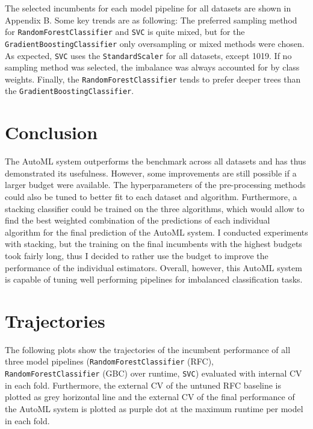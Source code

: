 \documentclass[11pt]{article}
\begin{document}
The selected incumbents for each model pipeline for all datasets are shown in Appendix B. Some key trends are as following: The preferred sampling method for \texttt{RandomForestClassifier} and \texttt{SVC} is quite mixed, but for the \texttt{GradientBoostingClassifier} only oversampling or mixed methods were chosen. As expected, \texttt{SVC} uses the \texttt{StandardScaler} for all datasets, except 1019. If no sampling method was selected, the imbalance was always accounted for by class weights. Finally, the \texttt{RandomForestClassifier} tends to prefer deeper trees than the \texttt{GradientBoostingClassifier}. \\

\section{Conclusion}

The AutoML system outperforms the benchmark across all datasets and has thus demonstrated its usefulness. However, some improvements are still possible if a larger budget were available. The hyperparameters of the pre-processing methods could also be tuned to better fit to each dataset and algorithm. Furthermore, a stacking classifier could be trained on the three algorithms, which would allow to find the best weighted combination of the predictions of each individual algorithm for the final prediction of the AutoML system. I conducted experiments with stacking, but the training on the final incumbents with the highest budgets took fairly long, thus I decided to rather use the budget to improve the performance of the individual estimators. Overall, however, this AutoML system is capable of tuning well performing pipelines for imbalanced classification tasks.





\newpage
\appendix

\section{Trajectories}

The following plots show the trajectories of the incumbent performance of all three model pipelines (\texttt{RandomForestClassifier} (RFC), \texttt{RandomForestClassifier} (GBC) over runtime, \texttt{SVC}) evaluated with internal CV in each fold. Furthermore, the external CV of the untuned RFC baseline is plotted as grey horizontal line and the external CV of the final performance of the AutoML system is plotted as purple dot at the maximum runtime per model in each fold.
\end{document}
